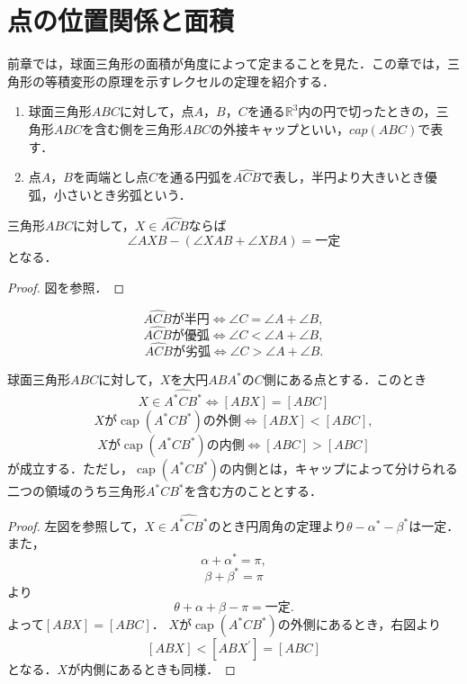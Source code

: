\documentclass[uplatex]{jsarticle}
\DeclareMathOperator{\capp}{cap}
\begin{document}
\section{点の位置関係と面積}
前章では，球面三角形の面積が角度によって定まることを見た．この章では，三角形の等積変形の原理を示すレクセルの定理を紹介する．
\begin{definition}
\begin{enumerate}[label=(\arabic*)]
\item 球面三角形$ABC$に対して，点$A$，$B$，$C$を通る$\mathbb{R}^3$内の円で切ったときの，三角形$ABC$を含む側を三角形$ABC$の外接キャップといい，$cap(ABC)$で表す．
\item 点$A，B$を両端とし点$C$を通る円弧を$\widehat{ACB}$で表し，半円より大きいとき優弧，小さいとき劣弧という．
\end{enumerate}
\end{definition}

\begin{proposition}[球面上の円周角の定理]

三角形$ABC$に対して，$X\in\widehat{ACB}$ならば
\[ \angle AXB-(\angle XAB+\angle XBA)=一定 \]
となる．
\end{proposition}
\begin{proof}
図を参照．
\end{proof}
\begin{center}

\end{center}
\begin{corollary}
\[ \text{$\widehat{ACB}$が半円}\Leftrightarrow \angle C=\angle A+\angle B, \]
\[ \text{$\widehat{ACB}$が優弧}\Leftrightarrow \angle C<\angle A+\angle B, \]
\[ \text{$\widehat{ACB}$が劣弧}\Leftrightarrow \angle C>\angle A+\angle B. \]
\end{corollary}


\begin{theorem}[レクセルの定理]球面三角形$ABC$に対して，$X$を大円$ABA^*$の$C$側にある点とする．このとき
\[ X\in \widehat{A^*CB^*}\Leftrightarrow [ABX]=[ABC] \]
\[ \text{$X$が$\capp(A^*CB^*)$の外側}\Leftrightarrow [ABX]<[ABC], \]
\[ \text{$X$が$\capp(A^*CB^*)$の内側}\Leftrightarrow [ABC]>[ABC] \]
が成立する．ただし，$\capp(A^*CB^*)$の内側とは，キャップによって分けられる二つの領域のうち三角形$A^*CB^*$を含む方のこととする．\end{theorem}
\begin{center}

\end{center}


\begin{proof}
左図を参照して，$X\in \widehat{A^*CB^*}$のとき円周角の定理より$\theta-\alpha^*-\beta^*$は一定．また，
\[ \alpha+\alpha^*=\pi, \]
\[ \beta+\beta^*=\pi \]
より
\[ \theta+\alpha+\beta-\pi=\text{一定}.\]
よって$[ABX]=[ABC]$．
$X$が$\capp(A^*CB^*)$の外側にあるとき，右図より
\[ [ABX]<[ABX^{\prime}]=[ABC] \]
となる．$X$が内側にあるときも同様．
\end{proof}
\end{document}
